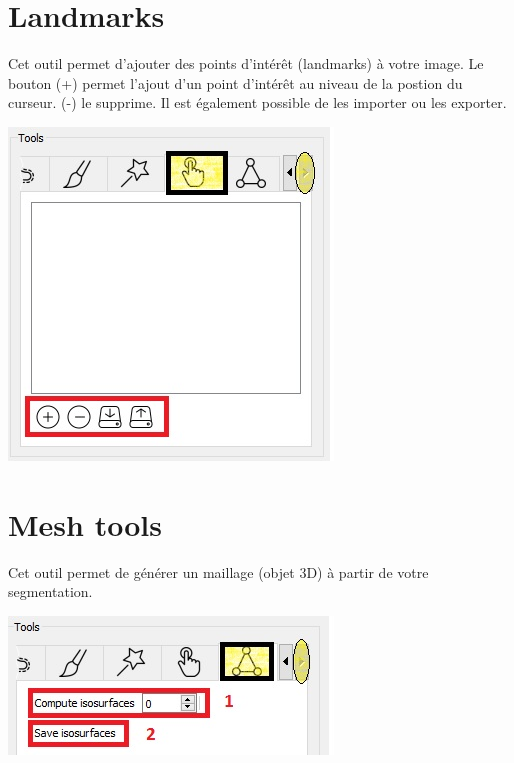 \documentclass {article}
\begin{document}
\section{Landmarks}

Cet outil permet d'ajouter des points d'intérêt (landmarks) à votre image. Le bouton (+) permet l'ajout d'un point d'intérêt au niveau de la postion du curseur. (-) le supprime. Il est également possible de les importer ou les exporter.

\begin{center}
		\includegraphics{Iconographie/landmarks.jpg}
\end{center}



\section{Mesh tools}

Cet outil permet de générer un maillage (objet 3D) à partir de votre segmentation.

\begin{center}
		\includegraphics{Iconographie/mesh_tools.jpg}
\end{center}
\end{document}
